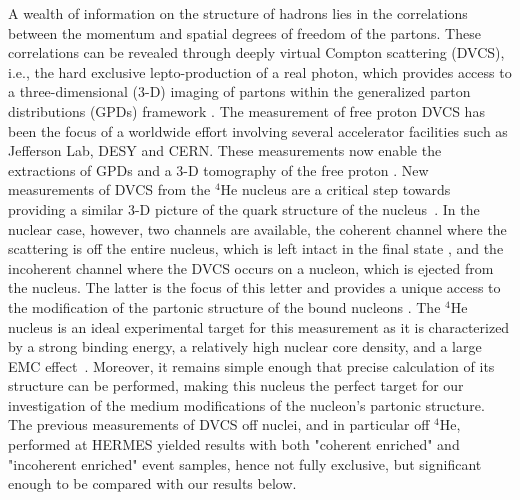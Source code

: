 \documentclass[twocolumn,nofootinbib,prl,superscriptaddress,secnumarabic,amssymb,nobibnotes,aps,floatfix]{revtex4}
\begin{document}
A wealth of information on the structure of hadrons lies in the correlations 
between the momentum and spatial degrees of freedom of the partons. These 
correlations can be revealed through deeply virtual Compton scattering (DVCS), 
i.e., the hard exclusive lepto-production of a real photon, which provides 
access to a three-dimensional (3-D) imaging of partons within the generalized 
parton distributions (GPDs) framework 
\cite{Mueller:1998fv,Ji:1996ek,Ji:1996nm,Radyushkin:1996nd,Radyushkin:1997ki}.   
The measurement of free proton DVCS has been the focus of a worldwide effort 
\cite{Stepanyan:2001sm,Airapetian:2001yk,Airapetian:2006zr,Chekanov:2003ya,Aktas:2005ty,Chen:2006na,Defurne:2015kxq,Girod:2007aa,Mazouz:2007aa,Gavalian:2009,Seder:2015,Pisano:2015,Jo:2015ema}
involving several accelerator facilities such as Jefferson Lab, DESY and  
CERN. These measurements now enable the extractions of GPDs 
and a 3-D tomography of the free proton \cite{Guidal:2013rya,Dupre:2016mai}.  
New measurements of DVCS from the $^{4}$He nucleus are a critical step towards 
providing a similar 3-D picture of the quark structure of the 
nucleus~\cite{Dupre:2015jha}. In the nuclear case, however, two channels are 
available, the coherent channel where the scattering is off the entire nucleus, 
which is left intact in the final state \cite{Hattawy:2017woc}, and the 
incoherent channel where the DVCS occurs on a nucleon, which is ejected from 
the nucleus. The latter is the focus of this letter and provides a unique 
access to the modification of the partonic structure of the bound nucleons 
\cite{simonetta_2,Guzey:2006xi,Guzey:2008fe}.  The $^{4}$He nucleus is an ideal 
experimental target for this measurement as it is characterized by a strong 
binding energy, a relatively high nuclear core density, and a large EMC 
effect~\cite{JSeely}. Moreover, it remains simple enough that precise 
calculation of its structure can be performed, making this nucleus the perfect 
target for our investigation of the medium modifications of the nucleon's 
partonic structure. The previous measurements of DVCS off nuclei, and in 
particular off $^4$He, performed at HERMES \cite{Airapetian:2009cga} yielded 
results with both "coherent enriched" and "incoherent enriched" event samples, 
hence not fully exclusive, but significant enough to be compared with our 
results below. 
\end{document}
